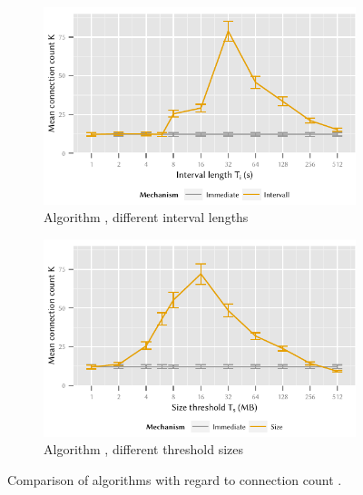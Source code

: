 \begin{figure}
	\begin{subfigure}[b]{\textwidth}
	\centering
	\includegraphics{application/cloud_file_synchronization/numerical_evaluation/figures/interval_connection}
	\caption{Algorithm \algointerval, different interval lengths \thresholdInterval}\label{fig:application:cloud_file_synchronisation:numerical_evaluation:connection:connection:interval}
	\end{subfigure}
	\begin{subfigure}[b]{\textwidth}
	\centering
	\includegraphics{application/cloud_file_synchronization/numerical_evaluation/figures/size_connection}
	\caption{Algorithm \algosize, different threshold sizes \thresholdSize}\label{fig:application:cloud_file_synchronisation:numerical_evaluation:connection:connection:size}
	\end{subfigure}

	\caption{Comparison of algorithms with regard to connection count \connectionCount.}\label{fig:application:cloud_file_synchronisation:numerical_evaluation:connection:connection}
\end{figure}

